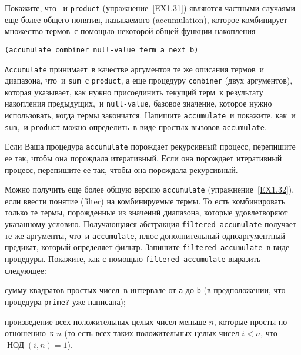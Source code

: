 \begin{exercise}[]{1.32}\label{EX1.32}%
\begin{plainenum}
\item
Покажите, что ~и 
{\tt product} (упражнение~\ref{EX1.31}) являются
частными случаями еще более общего понятия, называемого 
 (accumulation), которое комбинирует множество 
термов~с помощью некоторой общей функции накопления

\begin{Verbatim}[fontsize=\small]
(accumulate combiner null-value term a next b)
\end{Verbatim}
{\tt Accumulate} принимает~в качестве аргументов те же описания 
термов~и диапазона, что~и {\tt sum}~с {\tt product}, а
еще процедуру {\tt combiner} (двух аргументов), которая
указывает, как нужно присоединить текущий терм~к результату накопления
предыдущих,~и {\tt null-value}, базовое
значение, которое нужно использовать, когда термы закончатся.
Напишите {\tt accumulate}~и покажите, как~и {\tt sum},~и 
{\tt product} можно определить~в виде простых вызовов
{\tt accumulate}.

\item
Если Ваша процедура {\tt accumulate}
порождает рекурсивный процесс, перепишите ее так, чтобы она порождала
итеративный.  Если она порождает итеративный процесс, перепишите ее
так, чтобы она порождала рекурсивный.
\end{plainenum}
\end{exercise}
\begin{exercise}{1.33}\label{EX1.33}%
Можно получить еще более общую версию
{\tt accumulate} (упражнение~\ref{EX1.32}), если
ввести понятие %
 (filter) на комбинируемые
термы.  То есть комбинировать только те термы, порожденные из значений 
диапазона, которые удовлетворяют указанному условию.  Получающаяся
абстракция {\tt filtered-accumulate}
получает те же аргументы,
что~и {\tt accumulate}, плюс дополнительный одноаргументный
предикат, который определяет фильтр.  Запишите
{\tt filtered-accumulate}~в виде процедуры.  Покажите, как с
помощью {\tt filtered-accumulate} выразить следующее:

\begin{plainenum}
\item
сумму квадратов простых чисел~в интервале от
{\tt a} до {\tt b} (в предположении, что процедура
{\tt prime?} уже написана);

\item
произведение всех положительных целых чисел меньше
$n$, которые
просты по отношению~к $n$ (то есть
всех таких положительных целых чисел $i < n$, что
$\mathop{\mbox{НОД}} (i,n) = 1$).
\end{plainenum}
\end{exercise}

